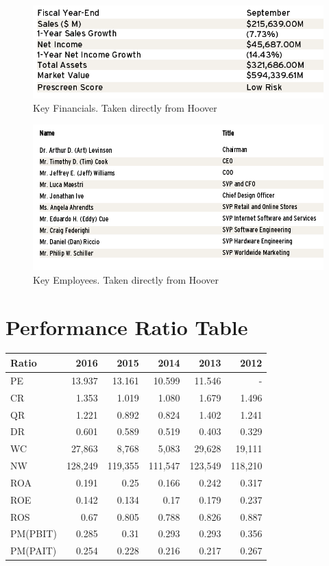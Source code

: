 \documentclass[12pt,a4paper,titlepage]{article}
\begin{document}
\begin{figure}[!htb]
  \centering
  \includegraphics[width=1\textwidth]{keyfin}
  \caption{Key Financials. Taken directly from Hoover~\cite{hoover}}
\end{figure}

\begin{figure}[!htb]
  \centering
  \includegraphics[width=1\textwidth]{employ}
  \caption{Key Employees. Taken directly from Hoover~\cite{hoover}}
\end{figure}

\section{Performance Ratio Table}
\begin{center}
  \begin{tabular}{lrrrrr}
    Ratio & 2016 & 2015 & 2014 & 2013 & 2012\\
    \hline
    PE & 13.937 & 13.161 & 10.599 & 11.546 & -\\
    CR & 1.353 & 1.019 & 1.080 & 1.679 & 1.496\\
    QR & 1.221 & 0.892 & 0.824 & 1.402 & 1.241\\
    DR & 0.601 & 0.589 & 0.519 & 0.403 & 0.329\\
    WC & 27,863 & 8,768 & 5,083 & 29,628 & 19,111\\
    NW & 128,249 & 119,355 & 111,547 & 123,549 & 118,210\\
    ROA & 0.191 & 0.25 & 0.166 & 0.242 & 0.317\\
    ROE & 0.142 & 0.134 & 0.17 & 0.179 & 0.237\\
    ROS & 0.67 & 0.805 & 0.788 & 0.826 & 0.887\\
    PM(PBIT) & 0.285 & 0.31 & 0.293 & 0.293 & 0.356\\
    PM(PAIT) & 0.254 & 0.228 & 0.216 & 0.217 & 0.267\\
  \end{tabular}
\end{center}
\end{document}
